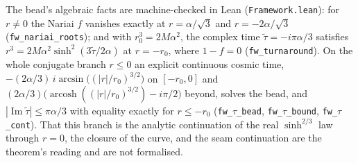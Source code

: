 \documentclass[11pt,a4paper]{article}
\theoremstyle{plain}
\theoremstyle{definition}
\theoremstyle{remark}
\begin{document}
\noindent The bead's algebraic facts are machine-checked in Lean (\texttt{Framework.lean}): for $r\neq0$ the Nariai $f$ vanishes exactly at $r=\alpha/\sqrt3$ and $r=-2\alpha/\sqrt3$ (\texttt{fw\_nariai\_roots}); and with $r_{0}^{3}=2M\alpha^{2}$, the complex time $\tilde\tau=-i\pi\alpha/3$ satisfies $r^{3}=2M\alpha^{2}\sinh^{2}(3\tilde\tau/2\alpha)$ at $r=-r_{0}$, where $1-f=0$ (\texttt{fw\_turnaround}). On the whole conjugate branch $r\le0$ an explicit continuous cosmic time, $-(2\alpha/3)\,i\arcsin\bigl((|r|/r_{0})^{3/2}\bigr)$ on $[-r_{0},0]$ and $(2\alpha/3)\bigl(\operatorname{arcosh}((|r|/r_{0})^{3/2})-i\pi/2\bigr)$ beyond, solves the bead, and $|\operatorname{Im}\tilde\tau|\le\pi\alpha/3$ with equality exactly for $r\le-r_{0}$ (\texttt{fw\_$\tau$\_bead}, \texttt{fw\_$\tau$\_bound}, \texttt{fw\_$\tau$\_cont}). That this branch is the analytic continuation of the real $\sinh^{2/3}$ law through $r=0$, the closure of the curve, and the seam continuation are the theorem's reading and are not formalised.
\end{document}
